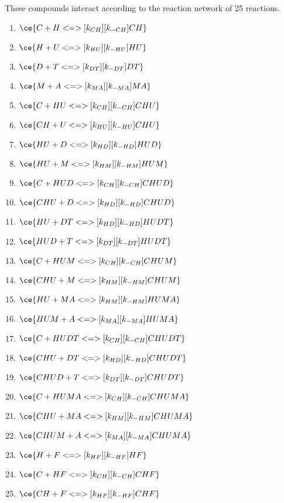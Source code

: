 These compounds interact according to the reaction network of 25 reactions.

\begin{enumerate}

\item $\ce{C + H <=>[k_{CH}][k_{-CH}] CH}$ %
\item $\ce{H + U <=>[k_{HU}][k_{-HU}] HU}$ %
\item $\ce{D + T <=>[k_{DT}][k_{-DT}] DT}$ %
\item $\ce{M + A <=>[k_{MA}][k_{-MA}] MA}$ %

\item $\ce{C + HU <=>[k_{CH}][k_{-CH}] CHU}$ %
\item $\ce{CH + U <=>[k_{HU}][k_{-HU}] CHU}$ %
\item $\ce{HU + D <=>[k_{HD}][k_{-HD}] HUD}$ %
\item $\ce{HU + M <=>[k_{HM}][k_{-HM}] HUM}$ %

\item $\ce{C + HUD <=>[k_{CH}][k_{-CH}] CHUD}$ %
\item $\ce{CHU + D <=>[k_{HD}][k_{-HD}] CHUD}$ %
\item $\ce{HU + DT <=>[k_{HD}][k_{-HD}] HUDT}$ %
\item $\ce{HUD + T <=>[k_{DT}][k_{-DT}] HUDT}$ %
\item $\ce{C + HUM <=>[k_{CH}][k_{-CH}] CHUM}$ %
\item $\ce{CHU + M <=>[k_{HM}][k_{-HM}] CHUM}$ %
\item $\ce{HU + MA <=>[k_{HM}][k_{-HM}] HUMA}$ %
\item $\ce{HUM + A <=>[k_{MA}][k_{-MA}] HUMA}$ %

\item $\ce{C + HUDT <=>[k_{CH}][k_{-CH}] CHUDT}$ %
\item $\ce{CHU + DT <=>[k_{HD}][k_{-HD}] CHUDT}$ %
\item $\ce{CHUD + T <=>[k_{DT}][k_{-DT}] CHUDT}$ %
\item $\ce{C + HUMA <=>[k_{CH}][k_{-CH}] CHUMA}$ %
\item $\ce{CHU + MA <=>[k_{HM}][k_{-HM}] CHUMA}$ %
\item $\ce{CHUM + A <=>[k_{MA}][k_{-MA}] CHUMA}$ %

\item $\ce{H + F <=>[k_{HF}][k_{-HF}] HF}$ %
\item $\ce{C + HF <=>[k_{CH}][k_{-CH}] CHF}$ %
\item $\ce{CH + F <=>[k_{HF}][k_{-HF}] CHF}$ %

\end{enumerate}

